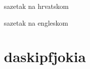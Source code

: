 \documentclass[zavrsni]{FSBtex}
\begin{document}
\titlepage



\begin{AbstractHR}
sazetak na hrvatskom
\end{AbstractHR}

\begin{AbstractEN}
sazetak na engleskom
\end{AbstractEN}

\PageNumberingArabic
\newpage
\chapter{daskipfjokia}
\end{document}
